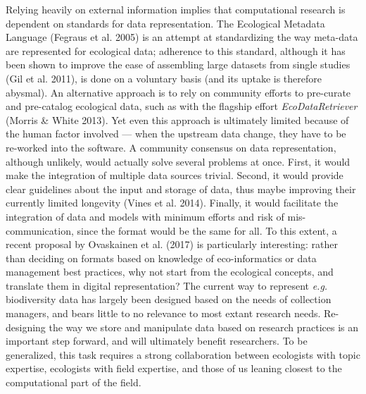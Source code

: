 \documentclass[12pt]{article}
\begin{document}
Relying heavily on external information implies that computational
research is dependent on standards for data representation. The
Ecological Metadata Language (Fegraus et al. 2005) is an attempt at
standardizing the way meta-data are represented for ecological data;
adherence to this standard, although it has been shown to improve the
ease of assembling large datasets from single studies (Gil et al. 2011),
is done on a voluntary basis (and its uptake is therefore abysmal). An
alternative approach is to rely on community efforts to pre-curate and
pre-catalog ecological data, such as with the flagship effort
\emph{EcoDataRetriever} (Morris \& White 2013). Yet even this approach
is ultimately limited because of the human factor involved --- when the
upstream data change, they have to be re-worked into the software. A
community consensus on data representation, although unlikely, would
actually solve several problems at once. First, it would make the
integration of multiple data sources trivial. Second, it would provide
clear guidelines about the input and storage of data, thus maybe
improving their currently limited longevity (Vines et al. 2014).
Finally, it would facilitate the integration of data and models with
minimum efforts and risk of mis-communication, since the format would be
the same for all. To this extent, a recent proposal by Ovaskainen et al.
(2017) is particularly interesting: rather than deciding on formats
based on knowledge of eco-informatics or data management best practices,
why not start from the ecological concepts, and translate them in
digital representation? The current way to represent \emph{e.g.}
biodiversity data has largely been designed based on the needs of
collection managers, and bears little to no relevance to most extant
research needs. Re-designing the way we store and manipulate data based
on research practices is an important step forward, and will ultimately
benefit researchers. To be generalized, this task requires a strong
collaboration between ecologists with topic expertise, ecologists with
field expertise, and those of us leaning closest to the computational
part of the field.
\end{document}

